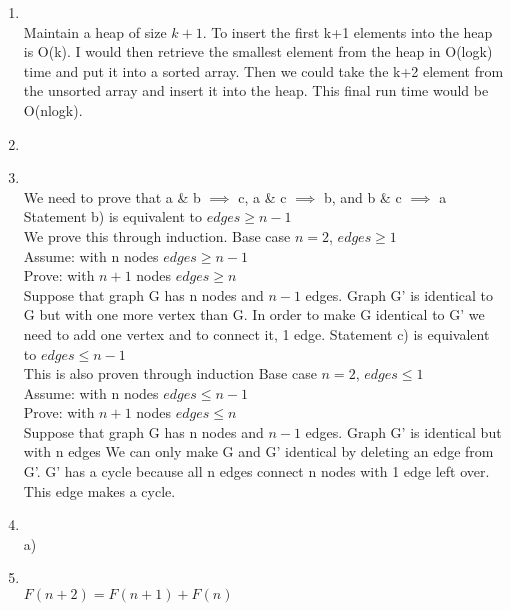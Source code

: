 \documentclass[11pt]{article}
\begin{document}
\begin{enumerate}
            \item \\
            Maintain a heap of size $k+1$.  To insert the first k+1 elements into the heap is O(k).
            I would then retrieve the smallest element from the heap in O(logk) time and put it into
            a sorted array.  Then we could take the k+2 element from the unsorted array and insert it
            into the heap.  This final run time would be O(nlogk).
            \item \\
            \item \\
            We need to prove that a \& b $\implies$ c, a \& c $\implies$ b, and b \& c $\implies$ a\\
            \newline
            Statement b) is equivalent to $edges\geq n-1$\\
            We prove this through induction.  Base case $n=2$, $edges\geq1$\\
            Assume: with n nodes $edges\geq n-1$\\
            Prove: with $n+1$ nodes $edges\geq n$\\
            Suppose that graph G has n nodes and $n-1$ edges.  Graph G' is identical to G but with
            one more vertex than G.  In order to make G identical to G' we need to add one vertex and
            to connect it, 1 edge.
            \newline
            \newline
            Statement c) is equivalent to $edges\leq n-1$\\
            This is also proven through induction
            Base case $n=2$, $edges\leq1$\\
            Assume: with n nodes $edges\leq n-1$\\
            Prove: with $n+1$ nodes $edges\leq n$\\
            Suppose that graph G has n nodes and $n-1$ edges.  Graph G' is identical but with n edges
            We can only make G and G' identical by deleting an edge from G'.  G' has a cycle because all
            n edges connect n nodes with 1 edge left over.  This edge makes a cycle.
            \item \\ a) \\
            \item \\
            $F(n+2) = F(n+1) + F(n)$\\

\end{enumerate}
\end{document}

